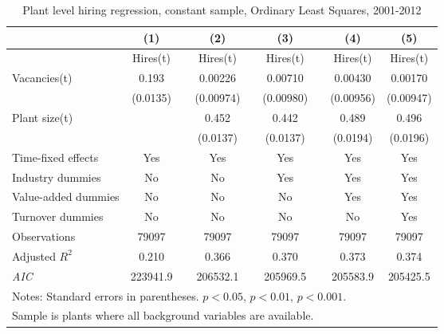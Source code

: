 \begin{table}[htbp]
\caption{\label{tab:robust_year_avg} Plant level hiring regression, constant sample, Ordinary Least Squares,  2001-2012}
\begin{tabularx} {\textwidth} { l  cXcXcXcc} 
\hline
       &   (1) &&     (2) &&    (3)       &&   (4)        &  (5)      \\
\hline
        &   \footnotesize{Hires(t)} &&     \footnotesize{Hires(t)} &&    \footnotesize{Hires(t)}      &&  \footnotesize{Hires(t)}       &    \footnotesize{Hires(t)}     \\
\hline
Vacancies(t) &       0.193\sym{***} &&     0.00226         &&     0.00710         &&     0.00430         &     0.00170                   \\
                    &    (0.0135)         &&   (0.00974)         &&   (0.00980)         &&   (0.00956)         &   (0.00947)         \\
Plant size(t)      &     &&                0.452\sym{***}&&       0.442\sym{***}&&       0.489\sym{***}&       0.496\sym{***} \\
                    &                   &&     (0.0137)         &&    (0.0137)         &&    (0.0194)         &    (0.0196)               \\
\hline
\footnotesize{Time-fixed effects}  & Yes                 && Yes                     &&           Yes          &&    Yes        &    Yes      \\
\footnotesize{Industry dummies}   & No                  && No                      &&     Yes                 &&    Yes        &  Yes      \\
\footnotesize{Value-added dummies} & No                  && No                      &&     No                 &&    Yes        &    Yes      \\
\footnotesize{Turnover dummies }   & No                  && No                      &&     No                 &&    No        &    Yes      \\
\hline
Observations        &    79097         &&       79097         &&       79097         &&       79097         &       79097      \\
Adjusted \(R^{2}\)  &      0.210         &&       0.366         &&       0.370         &&       0.373         &       0.374         \\
\textit{AIC}        &   223941.9         &&    206532.1         &&    205969.5         &&    205583.9         &    205425.5              \\
\hline\hline
\multicolumn{9}{l}{\footnotesize Notes: Standard errors in parentheses. \sym{*} \(p<0.05\), \sym{**} \(p<0.01\), \sym{***} \(p<0.001\).     }\\
\multicolumn{9}{l}{\footnotesize Sample is plants where all background variables are available.}\\
\end{tabularx}
\end{table}





